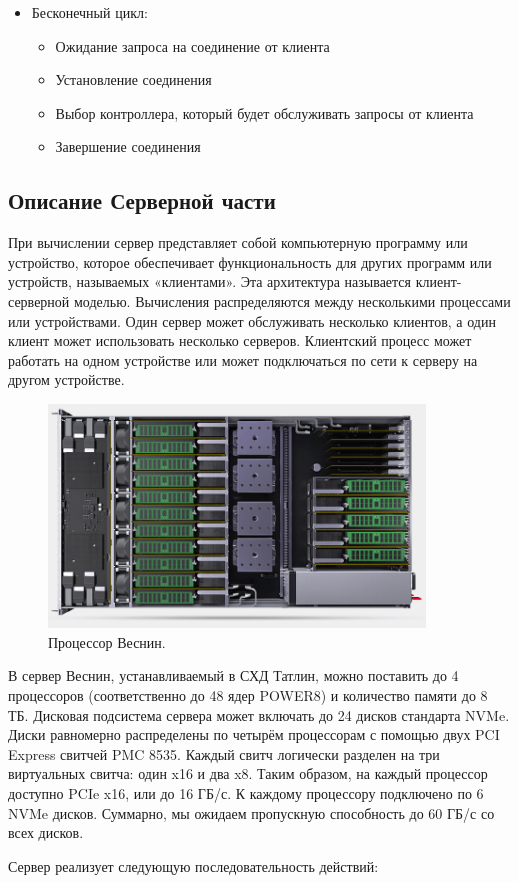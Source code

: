 \begin{itemize}

\item Бесконечный цикл:
	\begin{itemize}
		\item Ожидание запроса на соединение от клиента
		\item Установление соединения
		\item Выбор контроллера, который будет обслуживать запросы от клиента
		\item  Завершение соединения
	\end{itemize}
\end{itemize}

\subsection{Описание Серверной части}
\par 
При вычислении сервер представляет собой компьютерную программу или устройство, которое обеспечивает функциональность для других программ или устройств, называемых «клиентами». Эта архитектура называется клиент-серверной моделью. Вычисления распределяются между несколькими процессами или устройствами. Один сервер может обслуживать несколько клиентов, а один клиент может использовать несколько серверов. Клиентский процесс может работать на одном устройстве или может подключаться по сети к серверу на другом устройстве.

\begin{figure}[!ht]
\centering
\includegraphics[width=10cm]{Kenenbek/images/vesninproc.png}
\caption{Процессор Веснин.}
\label{fig:vesninproc}
\end{figure}

\par 
В сервер Веснин, устанавливаемый в СХД Татлин, можно поставить до 4 процессоров (соответственно до 48 ядер POWER8) и количество памяти до 8 ТБ. Дисковая подсистема сервера может включать до 24 дисков стандарта NVMe. Диски равномерно распределены по четырём процессорам с помощью двух PCI Express свитчей PMC 8535. Каждый свитч логически разделен на три виртуальных свитча: один x16 и два x8. Таким образом, на каждый процессор доступно PCIe x16, или до 16 ГБ/с. К каждому процессору подключено по 6 NVMe дисков. Суммарно, мы ожидаем пропускную способность до 60 ГБ/с со всех дисков.
\par
Сервер реализует следующую последовательность действий: 

